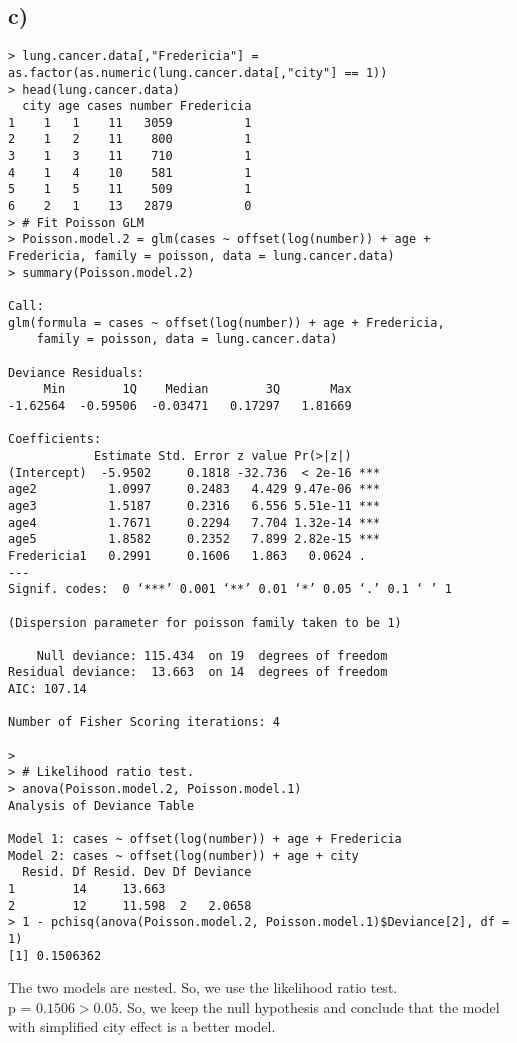\documentclass[a4paper]{article}
\begin{document}
\subsection{c)}
\begin{lstlisting}
> lung.cancer.data[,"Fredericia"] = as.factor(as.numeric(lung.cancer.data[,"city"] == 1))
> head(lung.cancer.data)
  city age cases number Fredericia
1    1   1    11   3059          1
2    1   2    11    800          1
3    1   3    11    710          1
4    1   4    10    581          1
5    1   5    11    509          1
6    2   1    13   2879          0
> # Fit Poisson GLM
> Poisson.model.2 = glm(cases ~ offset(log(number)) + age + Fredericia, family = poisson, data = lung.cancer.data)
> summary(Poisson.model.2)

Call:
glm(formula = cases ~ offset(log(number)) + age + Fredericia, 
    family = poisson, data = lung.cancer.data)

Deviance Residuals: 
     Min        1Q    Median        3Q       Max  
-1.62564  -0.59506  -0.03471   0.17297   1.81669  

Coefficients:
            Estimate Std. Error z value Pr(>|z|)    
(Intercept)  -5.9502     0.1818 -32.736  < 2e-16 ***
age2          1.0997     0.2483   4.429 9.47e-06 ***
age3          1.5187     0.2316   6.556 5.51e-11 ***
age4          1.7671     0.2294   7.704 1.32e-14 ***
age5          1.8582     0.2352   7.899 2.82e-15 ***
Fredericia1   0.2991     0.1606   1.863   0.0624 .  
---
Signif. codes:  0 ‘***’ 0.001 ‘**’ 0.01 ‘*’ 0.05 ‘.’ 0.1 ‘ ’ 1

(Dispersion parameter for poisson family taken to be 1)

    Null deviance: 115.434  on 19  degrees of freedom
Residual deviance:  13.663  on 14  degrees of freedom
AIC: 107.14

Number of Fisher Scoring iterations: 4

> 
> # Likelihood ratio test.
> anova(Poisson.model.2, Poisson.model.1)
Analysis of Deviance Table

Model 1: cases ~ offset(log(number)) + age + Fredericia
Model 2: cases ~ offset(log(number)) + age + city
  Resid. Df Resid. Dev Df Deviance
1        14     13.663            
2        12     11.598  2   2.0658
> 1 - pchisq(anova(Poisson.model.2, Poisson.model.1)$Deviance[2], df = 1)
[1] 0.1506362
\end{lstlisting}

The two models are nested. So, we use the likelihood ratio test.\\
p = $0.1506 > 0.05$. So, we keep the null hypothesis and conclude that the model with simplified city effect is a better model.
\end{document}
